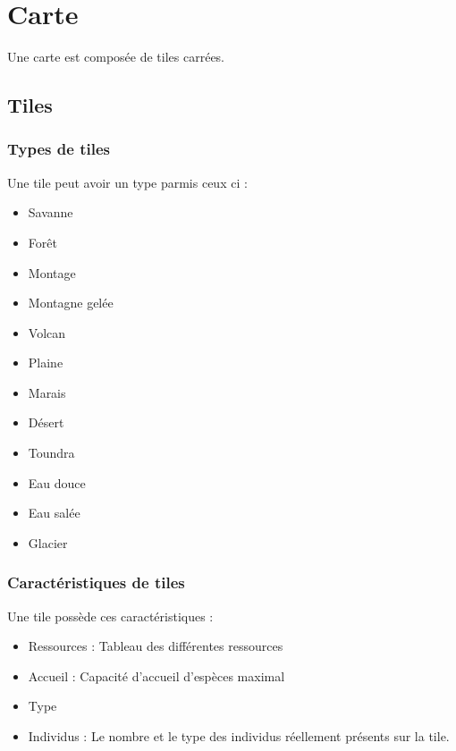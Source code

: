 \section{Carte}
Une carte est composée de tiles carrées.
\subsection{Tiles}
\subsubsection{Types de tiles}
Une tile peut avoir un type parmis ceux ci :
\begin{itemize}
	\item Savanne
	\item Forêt
	\item Montage
	\item Montagne gelée
	\item Volcan
	\item Plaine
	\item Marais
	\item Désert
	\item Toundra
	\item Eau douce
	\item Eau salée
	\item Glacier
\end{itemize}
\subsubsection{Caractéristiques de tiles}
Une tile possède ces caractéristiques :
\begin{itemize}
	\item Ressources : Tableau des différentes ressources
	\item Accueil : Capacité d'accueil d'espèces maximal
	\item Type
	\item Individus : Le nombre et le type des individus réellement présents sur la tile.
\end{itemize}